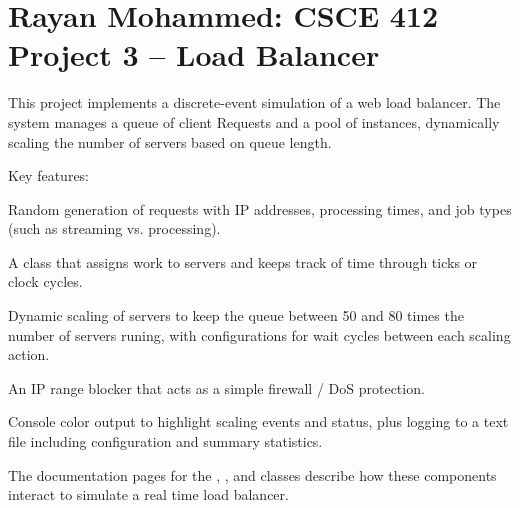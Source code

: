 \chapter{Rayan Mohammed\+: CSCE 412 Project 3 – Load Balancer}
\hypertarget{index}{}\label{index}
This project implements a discrete-\/event simulation of a web load balancer. The system manages a queue of client Requests and a pool of  instances, dynamically scaling the number of servers based on queue length.

Key features\+:
\begin{DoxyItemize}
\item Random generation of requests with IP addresses, processing times, and job types (such as streaming vs. processing).
\item A  class that assigns work to servers and keeps track of time through \textquotesingle{}ticks\textquotesingle{} or clock cycles.
\item Dynamic scaling of servers to keep the queue between 50 and 80 times the number of servers runing, with configurations for wait cycles between each scaling action.
\item An IP range blocker that acts as a simple firewall / DoS protection.
\item Console color output to highlight scaling events and status, plus logging to a text file including configuration and summary statistics.
\end{DoxyItemize}

The documentation pages for the , , and  classes describe how these components interact to simulate a real time load balancer. 